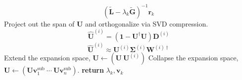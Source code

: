 \begin{algorithm}
\begin{algorithmic}[1]
\[                (
                    \tilde{\mathbf{L}}
                    -
                    \lambda_k
                    \tilde{\mathbf{G}}
                )^{-1}
                \mathbf{r}_k
            \]
            \State
            Project out the span of \(\mathbf{U}\) and orthogonalize via
            SVD compression.
            \[
                \widehat{\mathbf{U}}^{(i)}
                =
                (\mathbf{1} - \mathbf{U}^\dagger \mathbf{U})
                \mathbf{D}^{(i)}
            \]
            \[
                \widehat{\mathbf{U}}^{(i)}
                \approx
                \mathbf{U}^{(i)}
                \mathbf{\Sigma}^{(i)}
                \mathbf{W}^{(i)\dagger}
            \]
                \State
                Extend the expansion space,
                \(
                    \mathbf{U}
                    \leftarrow
                    (\mathbf{U}\ \mathbf{U}^{(i)})
                \)
            \Else
                \State
                Collapse the expansion space,
                \(
                    \mathbf{U}
                    \leftarrow
                    (
                        \mathbf{U}
                        \mathbf{v}_1^\mathrm{sub}\ 
                        \cdots\ 
                        \mathbf{U}
                        \mathbf{v}_n^\mathrm{sub}
                    )
                \).
            \EndIf
        \EndFor
        \State
        {\bfseries return}
        \(
            \lambda_k,
            \mathbf{v}_k
        \)
        \EndProcedure
    \end{algorithmic}
\end{algorithm}

